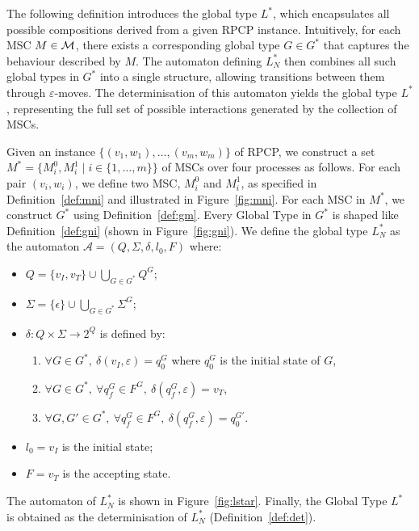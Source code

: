 The following definition introduces the global type $L^*$, which
encapsulates all possible compositions derived from a given RPCP instance.
Intuitively, for each MSC $M \in \mathcal{M}$, there exists a corresponding
global type $G \in G^*$ that captures the behaviour described by $M$.
The automaton defining $L^*_N$ then combines all such global types in $G^*$
into a single structure, allowing transitions between them through
$\varepsilon$-moves. The determinisation of this automaton yields the
global type $L^*$, representing the full set of possible interactions
generated by the collection of MSCs.

\bigskip

\begin{definition}\label{def:lstar}
	Given an instance $\{(v_1, w_1), \ldots, (v_m, w_m)\}$ of RPCP, we
	construct a set $M^* = \{M_i^0, M_i^1 \mid i \in \{1, \ldots, m\}\}$ of
	MSCs over four processes as follows. For each pair $(v_i, w_i)$,
	we define two MSC, $M_i^0$ and $M_i^1$, as specified in
	Definition~\ref{def:mni} and illustrated in Figure~\ref{fig:mni}.
	For each MSC in $M^*$, we construct $G^*$ using Definition~\ref{def:gm}.
	Every Global Type in $G^*$ is shaped like Definition~\ref{def:gni} 
	(shown in Figure~\ref{fig:gni}).
	We define the global type $L^*_{N}$ as the automaton
	$\mathcal A = (Q,\Sigma, \delta, l_0, F)$ where:
	\begin{itemize}
		\item $Q = \{v_I,v_T\}\cup \bigcup_{G\in G^*} Q^G$;
		\item $\Sigma = \{\epsilon\}\cup\bigcup_{G\in G^*} \Sigma^G$;
		\item $\delta: Q \times \Sigma \rightarrow 2^Q$ is defined by:
			      \begin{enumerate}
				       \item $\forall G \in G^*,\ \delta(v_I, \varepsilon) = q_0^G$ where $q_0^G$ is the initial state of $G$,
				       \item $\forall G \in G^*,\ \forall q_f^G \in F^G,\ \delta(q_f^G, \varepsilon) = v_T$,
				       \item $\forall G, G' \in G^*,\ \forall q_f^G \in F^G,\ \delta(q_f^G, \varepsilon) = q_0^{G'}$.
			      \end{enumerate}
		\item $l_0 = v_I$ is the initial state;
		\item $F = v_T$ is the accepting state.
	\end{itemize}
	The automaton of $L^*_{N}$ is shown in Figure~\ref{fig:lstar}.  
	Finally, the Global Type $L^*$ is obtained as the determinisation 
	of $L^*_{N}$ (Definition~\ref{def:det}).
\end{definition}

